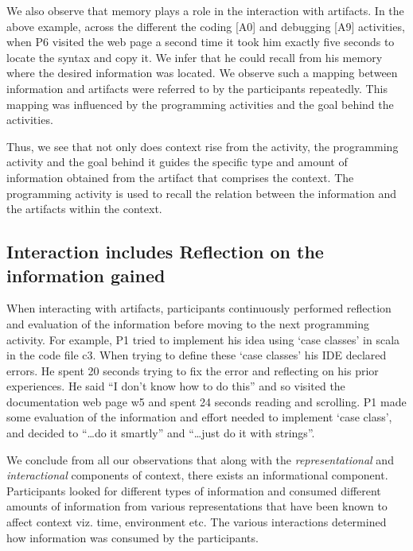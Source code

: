 We also observe that memory plays a role in the interaction with artifacts. In the above example, across the different the coding [A0] and debugging [A9] activities, when P6 visited the web page a second time it took him exactly five seconds to locate the syntax and copy it. We infer that he could recall from his memory where the desired information was located. We observe such a mapping between information and artifacts were referred to by the participants repeatedly. This mapping was influenced by the programming activities and the goal behind the activities.


Thus, we see that not only does context rise from the activity, the programming activity and the goal behind it guides the specific type and amount of information obtained from the artifact that comprises the context. The programming activity is used to recall the relation between the information and the artifacts within the context.



\subsection{Interaction includes Reflection on the information gained}


When interacting with artifacts, participants continuously performed reflection and evaluation of the information before moving to the next programming activity. For example, P1 tried to implement his idea using `case classes' in scala in the code file c3. When trying to define these `case classes' his IDE declared errors. He spent 20 seconds trying to fix the error and reflecting on his prior experiences. He said ``I don't know how to do this'' and so visited the documentation web page w5 and spent 24 seconds reading and scrolling. P1 made some evaluation of the information and effort needed to implement `case class', and decided to ``\dots do it smartly'' and ``\dots just do it with strings''.

We conclude from all our observations that along with the \textit{representational} and \textit{interactional} components of context, there exists an informational component. Participants looked for different types of information and consumed different amounts of information from various representations that have been known to affect context viz. time, environment etc. The various interactions determined how information was consumed by the participants. 